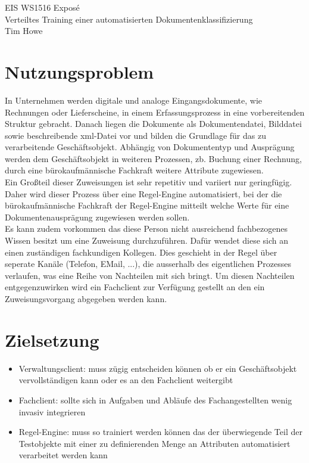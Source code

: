\documentclass[11pt,oneside,a4paper,notitlepage]{article}
\begin{document}
\begin{center}
\Large{EIS WS1516 Exposé}\\[3mm]
\normalsize{Verteiltes Training einer automatisierten Dokumentenklassifizierung}\\[3mm]
\normalsize{Tim Howe}
\end{center}

\section{Nutzungsproblem}
In Unternehmen werden digitale und analoge Eingangsdokumente, wie Rechnungen oder Lieferscheine, 
in einem Erfassungsprozess in eine vorbereitenden Struktur gebracht. Danach liegen die Dokumente als Dokumentendatei, Bilddatei sowie beschreibende xml-Datei vor und bilden die Grundlage für das zu verarbeitende Geschäftsobjekt. Abhängig von Dokumententyp und Ausprägung werden dem Geschäftsobjekt in weiteren Prozessen, zb. Buchung einer Rechnung, durch eine bürokaufmännische Fachkraft weitere Attribute zugewiesen.\\
Ein Großteil dieser Zuweisungen ist sehr repetitiv und variiert nur geringfügig. Daher wird dieser Prozess über eine Regel-Engine automatisiert, bei der die bürokaufmännische Fachkraft der Regel-Engine mitteilt welche Werte für eine Dokumentenausprägung zugewiesen werden sollen.\\
Es kann zudem vorkommen das diese Person nicht ausreichend fachbezogenes Wissen besitzt um eine Zuweisung durchzuführen. Dafür wendet diese sich an einen zuständigen fachkundigen Kollegen. Dies geschieht in der Regel über seperate Kanäle (Telefon, EMail, ...), die ausserhalb des eigentlichen Prozesses verlaufen, was eine Reihe von Nachteilen mit sich bringt. Um diesen Nachteilen entgegenzuwirken wird ein Fachclient zur Verfügung gestellt an den ein Zuweisungsvorgang abgegeben werden kann.

\section{Zielsetzung}
\begin{itemize}
\item Verwaltungsclient: muss zügig entscheiden können ob er ein Geschäftsobjekt vervollständigen kann oder es an den Fachclient weitergibt
\item Fachclient: sollte sich in Aufgaben und Abläufe des Fachangestellten wenig invasiv integrieren
\item Regel-Engine: muss so trainiert werden können das der überwiegende Teil der Testobjekte mit einer zu definierenden Menge an Attributen automatisiert verarbeitet werden kann
\end{itemize}
%
\end{document}
